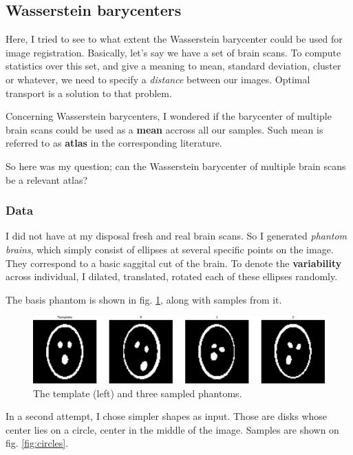 \FloatBarrier
\subsection{Wasserstein barycenters}

Here, I tried to see to what extent the Wasserstein barycenter could be used for image registration. Basically, let's say we have a set of brain scans. To compute statistics over this set, and give a meaning to mean, standard deviation, cluster or whatever, we need to specify a \textit{distance} between our images. Optimal transport is a solution to that problem. 

Concerning Wasserstein barycenters, I wondered if the barycenter of multiple brain scans could be used as a \textbf{mean} accross all our samples. Such mean is referred to as \textbf{atlas} in the corresponding literature. 

So here was my question; can the Wasserstein barycenter of multiple brain scans be a relevant atlas? 

\subsubsection{Data}

I did not have at my disposal fresh and real brain scans. So I generated \textit{phantom brains}, which simply consist of ellipses at several specific points on the image. They correspond to a basic saggital cut of the brain. To denote the \textbf{variability} across individual, I dilated, translated, rotated each of these ellipses randomly.

The basis phantom is shown in fig. \ref{fig:phantom_brains}, along with samples from it.

\begin{figure}[h]
    \centering
    \includegraphics[width=.8\textwidth]{samples/2/phantom_brains.png}
    \caption{The template (left) and three sampled phantoms.}
    \label{fig:phantom_brains}
\end{figure}

In a second attempt, I chose simpler shapes as input. Those are disks whose center lies on a circle, center in the middle of the image. Samples are shown on fig. \ref{fig:circles}.

